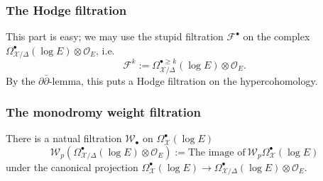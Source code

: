 \subsubsection{The Hodge filtration}
This part is easy; we may use the stupid filtration \(\mathcal{F}^{\bullet}\) on the
complex \(\Omega^{\bullet}_{\mathcal{X}\slash \Delta}(\log E)\otimes\mathscr{O}_{E}\),
i.e.
\begin{equation*}
    \mathcal{F}^{k}:=\Omega^{\bullet\ge k}_{\mathcal{X}\slash \Delta}(\log E)\otimes\mathscr{O}_{E}.
\end{equation*}
By the \(\partial\bar{\partial}\)-lemma, this puts a Hodge filtration 
on the hypercohomology.

\subsubsection{The monodromy weight filtration}

There is a natual 
filtration \(\mathcal{W}_{\bullet}\) on \(\Omega^{\bullet}_{\mathcal{X}}(\log E)\)
\begin{equation*}
    \mathcal{W}_{p}(\Omega^{\bullet}_{\mathcal{X}\slash \Delta}(\log E)\otimes\mathscr{O}_{E})
    :=\mbox{The image of}~\mathcal{W}_{p}\Omega^{\bullet}_{\mathcal{X}}(\log E)
\end{equation*}
under the canonical projection \(\Omega^{\bullet}_{\mathcal{X}}(\log E)\to 
\Omega^{\bullet}_{\mathcal{X}\slash \Delta}(\log E)\otimes\mathscr{O}_{E}\).

